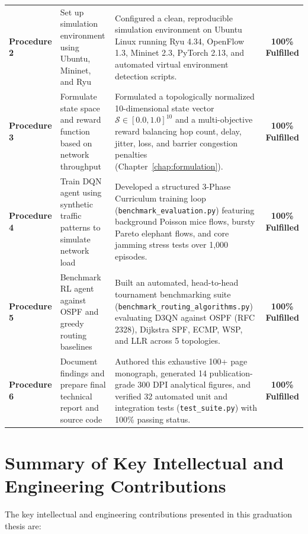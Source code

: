 \begin{table}[htbp]
\begin{tabularx}{\textwidth}{l p{4.0cm} X c}
\addlinespace
\textbf{Procedure 2} & Set up simulation environment using Ubuntu, Mininet, and Ryu & Configured a clean, reproducible simulation environment on Ubuntu Linux running Ryu 4.34, OpenFlow 1.3, Mininet 2.3, PyTorch 2.13, and automated virtual environment detection scripts. & \textbf{100\% Fulfilled} \\
\addlinespace
\textbf{Procedure 3} & Formulate state space and reward function based on network throughput & Formulated a topologically normalized 10-dimensional state vector $\mathcal{S} \in [0.0, 1.0]^{10}$ and a multi-objective reward balancing hop count, delay, jitter, loss, and barrier congestion penalties (Chapter~\ref{chap:formulation}). & \textbf{100\% Fulfilled} \\
\addlinespace
\textbf{Procedure 4} & Train DQN agent using synthetic traffic patterns to simulate network load & Developed a structured 3-Phase Curriculum training loop (\texttt{benchmark\_evaluation.py}) featuring background Poisson mice flows, bursty Pareto elephant flows, and core jamming stress tests over 1,000 episodes. & \textbf{100\% Fulfilled} \\
\addlinespace
\textbf{Procedure 5} & Benchmark RL agent against OSPF and greedy routing baselines & Built an automated, head-to-head tournament benchmarking suite (\texttt{benchmark\_routing\_algorithms.py}) evaluating D3QN against OSPF (RFC 2328), Dijkstra SPF, ECMP, WSP, and LLR across 5 topologies. & \textbf{100\% Fulfilled} \\
\addlinespace
\textbf{Procedure 6} & Document findings and prepare final technical report and source code & Authored this exhaustive 100+ page monograph, generated 14 publication-grade 300 DPI analytical figures, and verified 32 automated unit and integration tests (\texttt{test\_suite.py}) with 100\% passing status. & \textbf{100\% Fulfilled} \\
\bottomrule
\end{tabularx}
\end{table}

\section{Summary of Key Intellectual and Engineering Contributions}
The key intellectual and engineering contributions presented in this graduation thesis are:

